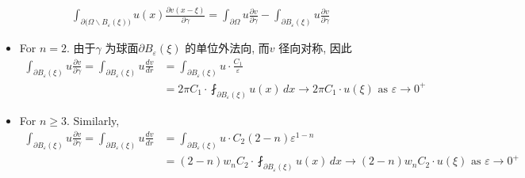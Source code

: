 \begin{enumerate}
			\begin{align*}
				\int_{\partial \Big( \Omega \backslash B_{\varepsilon}(\xi) \Big)} u(x) \frac{\partial v(x - \xi)}{\partial \gamma} 
				= \int_{\partial \Omega} u \frac{\partial v}{\partial \gamma} 
				- \int_{\partial B_{\varepsilon}(\xi)} u \frac{\partial v}{\partial \gamma}
			\end{align*}
			\begin{itemize}
				\item For $n = 2$. 由于$\gamma$ 为球面$\partial B_{\varepsilon}(\xi)$ 的单位外法向, 而$v$ 径向对称, 因此
				\begin{align*}
					\int_{\partial B_{\varepsilon}(\xi)} u \frac{\partial v}{\partial \gamma} 
					= \int_{\partial B_{\varepsilon}(\xi)} u \frac{d v}{dr} 
					&= \int_{\partial B_{\varepsilon}(\xi)} u \cdot \frac{C_1}{\varepsilon} \\
					&= 2\pi C_1 \cdot \fint_{\partial B_{\varepsilon}(\xi)} u(x) \, dx \to 2 \pi C_1 \cdot u(\xi) 
					\,\, \text{as} \,\, \varepsilon \to 0^+
				\end{align*}
				
				\item For $n \geq 3$. Similarly, 
				\begin{align*}
					\int_{\partial B_{\varepsilon}(\xi)} u \frac{\partial v}{\partial \gamma} 
					= \int_{\partial B_{\varepsilon}(\xi)} u \frac{d v}{dr} 
					&= \int_{\partial B_{\varepsilon}(\xi)} u \cdot C_2 (2 - n) \varepsilon^{1 - n} \\
					&= (2 - n) w_n C_2 \cdot \fint_{\partial B_{\varepsilon}(\xi)} u(x) \, dx 
					\to (2 - n) w_n C_2 \cdot u(\xi) \,\, \text{as} \,\, \varepsilon \to 0^+
				\end{align*}
			\end{itemize}
	\end{enumerate}
	
	\vspace*{4em}
	
